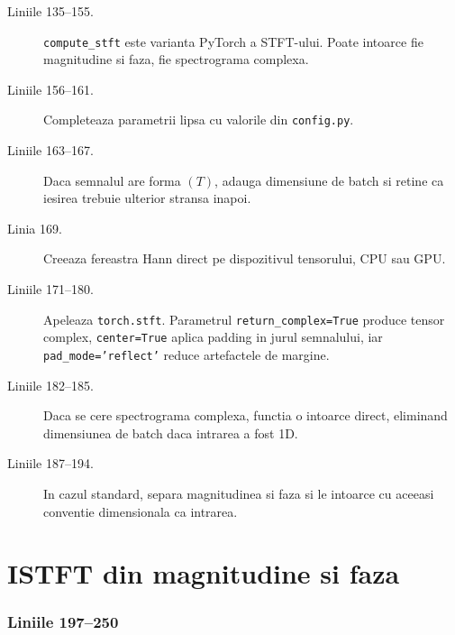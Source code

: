 \documentclass[12pt,a4paper]{report}
\newcommand{\codechunk}[2]{%
\subsection*{Liniile #1--#2}

}
\begin{document}
\begin{description}
    \item[Liniile 135--155.] \texttt{compute\_stft} este varianta PyTorch a STFT-ului.
    Poate intoarce fie magnitudine si faza, fie spectrograma complexa.

    \item[Liniile 156--161.] Completeaza parametrii lipsa cu valorile din
    \texttt{config.py}.

    \item[Liniile 163--167.] Daca semnalul are forma \((T)\), adauga dimensiune de
    batch si retine ca iesirea trebuie ulterior stransa inapoi.

    \item[Linia 169.] Creeaza fereastra Hann direct pe dispozitivul tensorului,
    CPU sau GPU.

    \item[Liniile 171--180.] Apeleaza \texttt{torch.stft}. Parametrul
    \texttt{return\_complex=True} produce tensor complex, \texttt{center=True}
    aplica padding in jurul semnalului, iar \texttt{pad\_mode='reflect'} reduce
    artefactele de margine.

    \item[Liniile 182--185.] Daca se cere spectrograma complexa, functia o intoarce
    direct, eliminand dimensiunea de batch daca intrarea a fost 1D.

    \item[Liniile 187--194.] In cazul standard, separa magnitudinea si faza si le
    intoarce cu aceeasi conventie dimensionala ca intrarea.
\end{description}

\chapter{ISTFT din magnitudine si faza}

\codechunk{197}{250}
\end{document}
